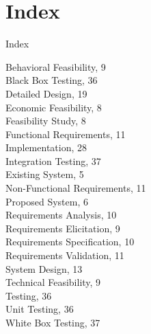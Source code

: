 \newpage
\thispagestyle{empty}
\chapter*{Index}
{\numberline{}Index}%

     Behavioral Feasibility, 9\\
     Black Box Testing, 36\\
     Detailed Design, 19\\
     Economic Feasibility, 8\\
     Feasibility Study, 8\\
     Functional Requirements, 11\\
     Implementation, 28\\
     Integration Testing, 37\\
     Existing System, 5\\
     Non-Functional Requirements, 11\\
     Proposed System, 6\\
     Requirements Analysis, 10\\
     Requirements Elicitation, 9\\
     Requirements Specification, 10\\
     Requirements Validation, 11\\
     System Design, 13\\
     Technical Feasibility, 9\\
     Testing, 36\\
     Unit Testing, 36\\
     White Box Testing, 37\\

